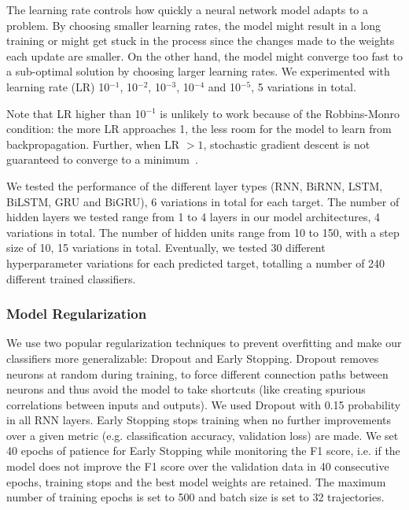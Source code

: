 \documentclass[sn-mathphys, pdflatex]{sn-jnl}
\newcommand{\rev}[1]{#1}
\begin{document}
The learning rate controls how quickly a neural network model adapts to a problem.
By choosing smaller learning rates, the model might result in a long training or might get stuck in the process
since the changes made to the weights each update are smaller.
On the other hand, the model might converge too fast to a sub-optimal solution by choosing larger learning rates.
We experimented with learning rate (LR) 10$^{-1}$, 10$^{-2}$, 10$^{-3}$, 10$^{-4}$ and 10$^{-5}$, 5 variations in total.
\rev{
Note that LR higher than 10$^{-1}$ is unlikely to work because of the Robbins-Monro condition:
the more LR approaches 1, the less room for the model to learn from backpropagation.
Further, when LR $> 1$, stochastic gradient descent is not guaranteed to converge to a minimum~\cite{Ranganath14}.
}

We tested the performance of the different layer types (RNN, BiRNN, LSTM, BiLSTM, GRU and BiGRU), 6 variations in total for each target.
The number of hidden layers we tested range from 1 to 4 layers in our model architectures, 4 variations in total.
The number of hidden units range from 10 to 150, with a step size of 10, 15 variations in total. %
Eventually, we tested 30 different hyperparameter variations for each predicted target,
totalling a number of 240 different trained classifiers.


\subsubsection{Model Regularization}

We use two popular regularization techniques to prevent overfitting and make our classifiers more generalizable: Dropout and Early Stopping.
Dropout removes neurons at random during training,
to force different connection paths between neurons
and thus avoid the model to take shortcuts (like creating spurious correlations between inputs and outputs).
We used Dropout with 0.15 probability in all RNN layers.
Early Stopping stops training when no further improvements over a given metric (e.g. classification accuracy, validation loss) are made.
We set 40 epochs of patience for Early Stopping while monitoring the F1 score,
i.e. if the model does not improve the F1 score over the validation data in 40 consecutive epochs,
training stops and the best model weights are retained.
The maximum number of training epochs is set to 500 and batch size is set to 32 trajectories.
\end{document}
